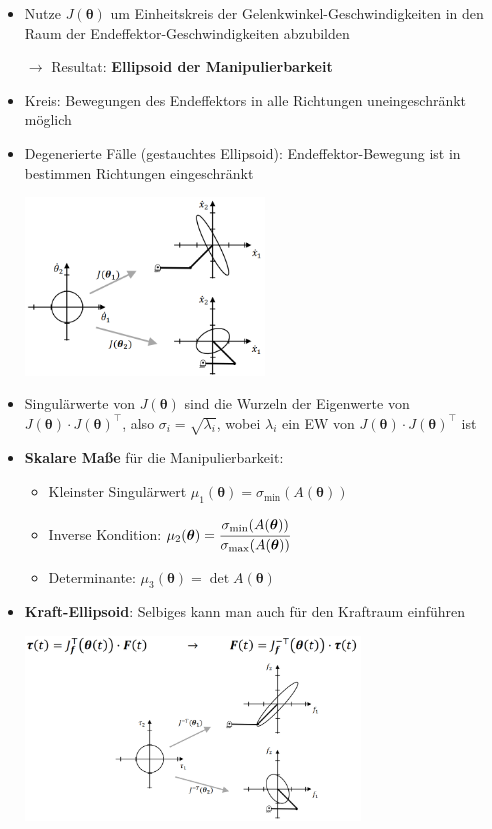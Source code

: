 \begin{itemize}
	\item Nutze $J(\boldsymbol{\theta})$ um Einheitskreis der Gelenkwinkel-Geschwindigkeiten in den Raum der Endeffektor-Geschwindigkeiten abzubilden 
	
	$\rightarrow$ Resultat: \textbf{Ellipsoid der Manipulierbarkeit}
	
	\item Kreis: Bewegungen des Endeffektors in alle Richtungen uneingeschränkt möglich
	\item Degenerierte Fälle (gestauchtes Ellipsoid): Endeffektor-Bewegung ist in bestimmen Richtungen eingeschränkt
	\begin{center}
		\includegraphics[width=0.5\textwidth]{images/edm.png}
	\end{center}
	\newpage
	
	\item Singulärwerte von $J(\boldsymbol{\theta})$ sind die Wurzeln der Eigenwerte von $J(\boldsymbol{\theta})\cdot J(\boldsymbol{\theta})^\top$, also $\sigma_i=\sqrt{\lambda_i}$, wobei $\lambda_i$ ein EW von $J(\boldsymbol{\theta})\cdot J(\boldsymbol{\theta})^\top$ ist
	\item \textbf{Skalare Maße} für die Manipulierbarkeit:
	\begin{itemize}
		\item Kleinster Singulärwert $\mu_1(\boldsymbol{\theta})=\sigma_\text{min} (A(\boldsymbol{\theta}))$
		\item Inverse Kondition: $\mu_2(\boldsymbol{\theta})=\cfrac{\sigma_\text{min} (A(\boldsymbol{\theta}))}{\sigma_\text{max} (A(\boldsymbol{\theta}))}$
		\item Determinante: $\mu_3(\boldsymbol{\theta})=\det A(\boldsymbol{\theta})$
	\end{itemize}
	\item \textbf{Kraft-Ellipsoid}: Selbiges kann man auch für den Kraftraum einführen
	\begin{center}
		\includegraphics[width=0.7\textwidth]{images/kraft-ellipsoid.png}
	\end{center}
\end{itemize}
